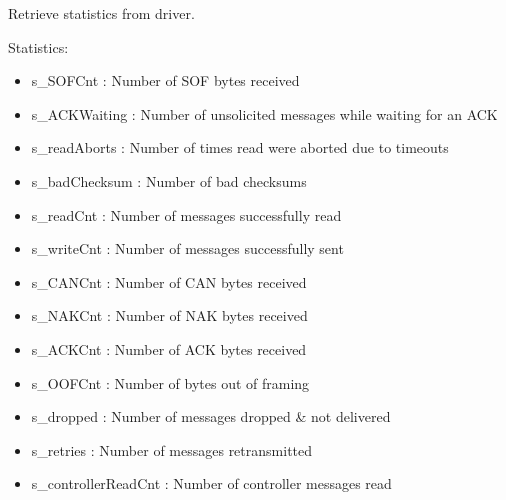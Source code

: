 \documentclass[letterpaper,10pt,english]{sphinxmanual}
\begin{document}
\begin{fulllineitems}
\begin{fulllineitems}
\end{fulllineitems}


\begin{fulllineitems}
\label{controller:openzwave.controller.ZWaveController.stats}
Retrieve statistics from driver.

Statistics:
\begin{itemize}
\item {} 
s\_SOFCnt                         : Number of SOF bytes received

\item {} 
s\_ACKWaiting                     : Number of unsolicited messages while waiting for an ACK

\item {} 
s\_readAborts                     : Number of times read were aborted due to timeouts

\item {} 
s\_badChecksum                    : Number of bad checksums

\item {} 
s\_readCnt                        : Number of messages successfully read

\item {} 
s\_writeCnt                       : Number of messages successfully sent

\item {} 
s\_CANCnt                         : Number of CAN bytes received

\item {} 
s\_NAKCnt                         : Number of NAK bytes received

\item {} 
s\_ACKCnt                         : Number of ACK bytes received

\item {} 
s\_OOFCnt                         : Number of bytes out of framing

\item {} 
s\_dropped                        : Number of messages dropped \& not delivered

\item {} 
s\_retries                        : Number of messages retransmitted

\item {} 
s\_controllerReadCnt              : Number of controller messages read


\end{itemize}
\end{fulllineitems}
\end{fulllineitems}
\end{document}

